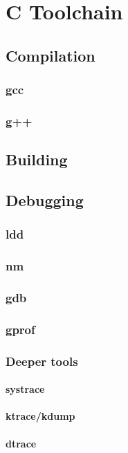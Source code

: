 \chapter {C Toolchain}

\section{Compilation}
\subsection{gcc}
\subsection{g++}
\section{Building}


\section{Debugging}
\subsection{ldd}
\subsection{nm}
\subsection{gdb}
\subsection{gprof}
\subsection{Deeper tools}
\subsubsection{systrace}
\subsubsection{ktrace/kdump}
\subsubsection{dtrace}
